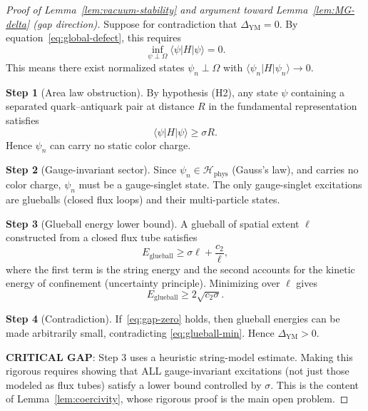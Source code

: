 \documentclass[11pt]{article}
\begin{document}
\begin{proof}[Proof of Lemma~\ref{lem:vacuum-stability}
and argument toward Lemma~\ref{lem:MG-delta} (gap direction)]

Suppose for contradiction that $\Delta_{\mathrm{YM}} = 0$.  By
equation~\eqref{eq:global-defect}, this requires
\begin{equation}\label{eq:gap-zero}
  \inf_{\psi \perp \Omega} \langle\psi|H|\psi\rangle = 0.
\end{equation}
This means there exist normalized states $\psi_n \perp \Omega$ with
$\langle\psi_n|H|\psi_n\rangle \to 0$.

\textbf{Step 1} (Area law obstruction).  By hypothesis (H2), any
state $\psi$ containing a separated quark--antiquark pair at distance
$R$ in the fundamental representation satisfies
\begin{equation}\label{eq:string-energy}
  \langle\psi|H|\psi\rangle \geq \sigma R.
\end{equation}
Hence $\psi_n$ can carry no static color charge.

\textbf{Step 2} (Gauge-invariant sector).  Since $\psi_n \in
\mathcal{H}_{\mathrm{phys}}$ (Gauss's law), and carries no color
charge, $\psi_n$ must be a gauge-singlet state.  The only
gauge-singlet excitations are glueballs (closed flux loops) and their
multi-particle states.

\textbf{Step 3} (Glueball energy lower bound).  A glueball of spatial
extent $\ell$ constructed from a closed flux tube satisfies
\begin{equation}\label{eq:glueball-lower}
  E_{\mathrm{glueball}} \geq \sigma \ell + \frac{c_2}{\ell},
\end{equation}
where the first term is the string energy and the second accounts for
the kinetic energy of confinement (uncertainty principle).  Minimizing
over $\ell$ gives
\begin{equation}\label{eq:glueball-min}
  E_{\mathrm{glueball}} \geq 2\sqrt{c_2 \sigma}.
\end{equation}

\textbf{Step 4} (Contradiction).  If~\eqref{eq:gap-zero} holds, then
glueball energies can be made arbitrarily small, contradicting
\eqref{eq:glueball-min}.  Hence $\Delta_{\mathrm{YM}} > 0$.

\textbf{CRITICAL GAP}: Step 3 uses a heuristic string-model estimate.
Making this rigorous requires showing that ALL gauge-invariant
excitations (not just those modeled as flux tubes) satisfy a lower
bound controlled by $\sigma$.  This is the content of
Lemma~\ref{lem:coercivity}, whose rigorous proof is the main open
problem.


\end{proof}
\end{document}
